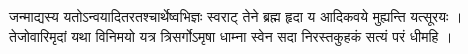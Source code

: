 जन्माद्यस्य यतोऽन्वयादितरतश्चार्थेष्वभिज्ञः स्वराट् 
तेने ब्रह्म हृदा य आदिकवये मुह्यन्ति यत्सूरयः ।
तेजोवारिमृदां यथा विनिमयो यत्र त्रिसर्गोऽमृषा
धाम्ना स्वेन सदा निरस्तकुहकं सत्यं परं धीमहि ।
